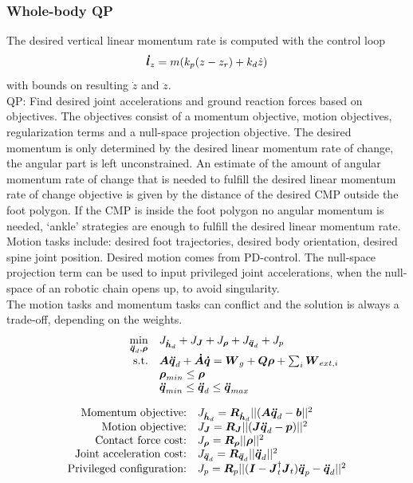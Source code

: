 \subsubsection{Whole-body QP}
The desired vertical linear momentum rate is computed with the control loop
\begin{equation}
\boldsymbol{\dot{l}}_z =m(k_p(z-z_r) + k_d\dot{z}) 
\end{equation}
with bounds on resulting $\dot{z}$ and $\ddot{z}$.\\
QP: Find desired joint accelerations and ground reaction forces based on objectives. The objectives consist of a momentum objective, motion objectives, regularization terms and a null-space projection objective. The desired momentum is only determined by the desired linear momentum rate of change, the angular part is left unconstrained. An estimate of the amount of angular momentum rate of change that is needed to fulfill the desired linear momentum rate of change objective is given by the distance of the desired \ac{CMP} outside the foot polygon. If the \ac{CMP} is inside the foot polygon no angular momentum is needed, `ankle' strategies are enough to fulfill the desired linear momentum rate. Motion tasks include: desired foot trajectories, desired body orientation, desired spine joint position. Desired motion comes from PD-control. The null-space projection term can be used to input privileged joint accelerations, when the null-space of an robotic chain opens up, to avoid singularity.\\
The motion tasks and momentum tasks can conflict and the solution is always a trade-off, depending on the weights.
\begin{equation*}
\begin{array}{rlcl}
\displaystyle \min_{\bs{\ddot{q}}_d,\bs{\rho}} & \multicolumn{3}{l}{J_{\bs{\dot{h}}_d} + J_{\bs{J}} + J_{\bs{\rho}} + J_{\bs{\ddot{q}}_d}  + J_p} \\
\textrm{s.t.} & \bs{A}\bs{\ddot{q}}_d + \bs{\dot{A}}\bs{\dot{q}} = \bs{W}_g + \bs{Q}\bs{\rho}+\sum_i\bs{W}_{ext,i}\\
&\displaystyle \bs{\rho}_{min} \leq \bs{\rho}\\
&\bs{\ddot{q}}_{min} \leq \bs{\ddot{q}}_d \leq \bs{\ddot{q}}_{max}
\end{array}
\end{equation*}

\begin{equation*}
\begin{array}{rlcl}
$Momentum objective:$ & J_{\bs{\dot{h}}_d}= \bs{R}_{\bs{\dot{h}}_d}||(\bs{A}\bs{\ddot{q}}_d -\bs{b}||^2\\
$Motion objective:$ & J_{\bs{J}} = \bs{R}_{\bs{J}}||(\bs{J}\bs{\ddot{q}}_d-\bs{p})||^2\\
$Contact force cost:$ & J_{\bs{\rho}}=\bs{R}_{\bs{\rho}}||\bs{\rho}||^2 \\
$Joint acceleration cost:$ & J_{\bs{\ddot{q}}_d} = \bs{R}_{\bs{\ddot{q}}_d}||\bs{\ddot{q}}_d ||^2 \\
$Privileged configuration:$ & J_p = \bs{R}_p||(\bs{I} - \bs{J}_t^{\dagger}\bs{J}_t)\bs{\ddot{q}}_p - \bs{\ddot{q}}_d||^2
\end{array}
\end{equation*}

